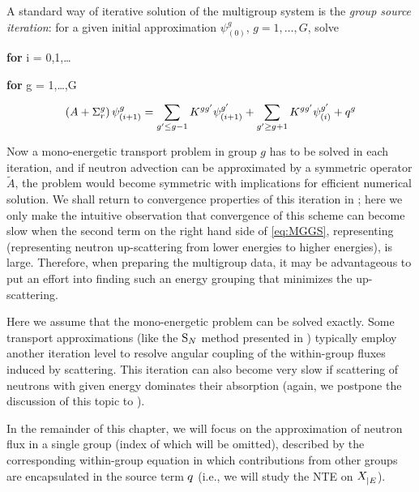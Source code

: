 A standard way of iterative solution of the multigroup system is the \textit{group source iteration}: for a given
initial approximation $\psi^g_{(0)}$, $g = 1,\ldots,G$, solve 
\begin{myitemize}
  \item \textbf{for} i = 0,1,\ldots
  \begin{myitemize}
  \item \textbf{for} g = 1,\ldots,G
	\begin{equation}\label{eq:MGGS}
		\left(A + \Sigma_r^g\right)\psi^g_{(i+1)} = \sum_{g'\leq g-1}^{} K^{gg'}\psi^{g'}_{(i+1)} + \sum_{g' \geq g+1}^{}
	  K^{gg'}\psi^{g'}_{(i)} + q^g
	\end{equation}  
 \end{myitemize}
\end{myitemize}
Now a mono-energetic transport problem in group $g$ has to be solved in each iteration, and if neutron advection
can be approximated by a symmetric operator $\tilde A$, the problem would become symmetric with implications for
efficient numerical solution. We shall return to convergence properties of this iteration in ; here we
only make the intuitive observation that convergence of this scheme can become slow when the second term on the
right hand side of \eqref{eq:MGGS}, representing (representing neutron up-scattering
from lower energies to higher energies), is large.
Therefore, when preparing the multigroup data, it may be advantageous to put an effort into finding such an energy grouping that minimizes the up-scattering.
\begin{remark}\label{rem:SI}
Here we assume that the
mono-energetic problem can be solved exactly. Some transport approximations (like the $\text{S}_{N}$ method presented in
) typically employ another iteration level to resolve angular coupling of the within-group fluxes
induced by scattering. This iteration can also become very slow if scattering of
neutrons with given energy dominates their absorption (again, we postpone the discussion of this topic to
).
\end{remark}

In the remainder
of this chapter, we will focus on the approximation of neutron flux in a single
group (index of which will be omitted), described by the corresponding within-group equation in which contributions from
other groups are encapsulated in the source term $q$ (i.e., we will study the NTE on $X_{\mid E}^{}$).

